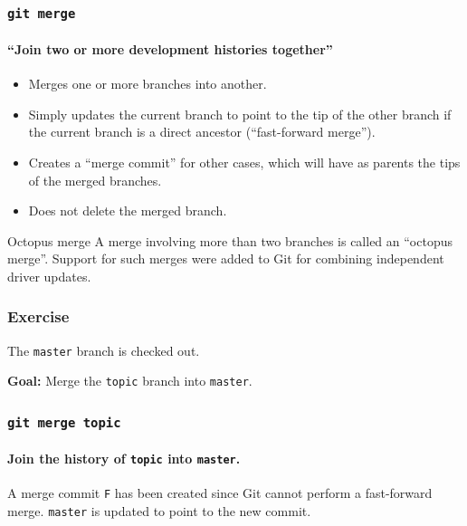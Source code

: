 \documentclass{beamer}
\newcommand\gitcmd[1]{\texttt{git #1}}
\newcommand\grefspec[1]{\texttt{#1}}
\newcommand\gbranch[1]{\texttt{#1}}
\newcommand\goal[1]{\textbf{Goal:} #1}
\begin{document}
\begin{frame}
  \frametitle{\gitcmd{merge}}
  \framesubtitle{``Join two or more development histories together''}
  \begin{itemize}
    \item Merges one or more branches into another.
    \item Simply updates the current branch to point to the tip of the other branch if the current branch is a direct ancestor (``fast-forward merge'').
    \item Creates a ``merge commit'' for other cases, which will have as parents the tips of the merged branches.
    \item Does not delete the merged branch.
  \end{itemize}
  \begin{block}{Octopus merge}
    A merge involving more than two branches is called an ``octopus merge''.
    Support for such merges were added to Git for combining independent driver updates.
  \end{block}
\end{frame}

\begin{frame}
  \frametitle{Exercise}

  The \gbranch{master} branch is checked out.

  \goal{Merge the \gbranch{topic} branch into \gbranch{master}.}
  
  \begin{figure}
    \centering
  \end{figure}
\end{frame}

\begin{frame}
  \frametitle{\gitcmd{merge topic}}
  \framesubtitle{Join the history of \gbranch{topic} into \gbranch{master}.}
  
  \begin{figure}
    \centering
  \end{figure}

  A merge commit \grefspec{F} has been created since Git cannot perform a fast-forward merge. \gbranch{master} is updated to point to the new commit.
\end{frame}
\end{document}
